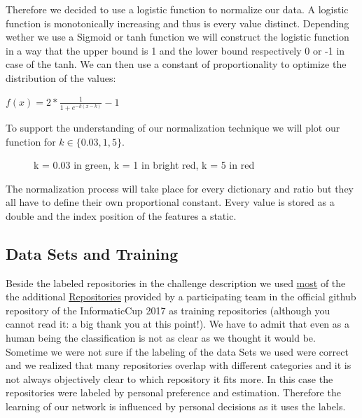 \documentclass[paper=A4,pagesize=auto,11pt,headinclude=true,footinclude=true,BCOR=0mm,DIV=calc]{scrartcl}
\begin{document}
	
	Therefore we decided to use a logistic function to normalize our data. A logistic function is monotonically increasing and thus is every value distinct. Depending wether we use a Sigmoid or tanh function we will construct the logistic function in a way that the upper bound is 1 and the lower bound respectively 0 or -1 in case of the tanh. 
	We can then use a constant of proportionality to optimize the distribution of the values:
	
	$f(x) = 2 * \frac{1}{1 + e^{-k(x-k)}} -1$
	
	To support the understanding of our normalization technique we will plot our function for $k \in \{0.03, 1, 5\}$.\\
	\begin{figure}[H]
		\caption{k = 0.03 in green, k = 1 in bright red, k = 5 in red}
	\end{figure}
	
	The normalization process will take place for every dictionary and ratio but they all have to define their own proportional constant.
	Every value is stored as a double and the index position of the features a static.
	
	
	
	
	
	\subsection{Data Sets and Training}
	Beside the labeled repositories in the challenge description we used \hyperref[src:TrainingRepositories]{most} of the the additional \hyperref[src:Repositories]{Repositories} provided by a participating team in the official github repository of the InformaticCup 2017 as training repositories (although you cannot read it: a big thank you at this point!). We have to admit that even as a human being the classification is not as clear as we thought it would be. Sometime we were not sure if the labeling of the data Sets we used were correct and we realized that many repositories overlap with different categories and it is not always objectively clear to which repository it fits more. In this case the repositories were labeled by personal preference and estimation. Therefore the learning of our network is influenced by personal decisions as it uses the labels.
	
\end{document}
